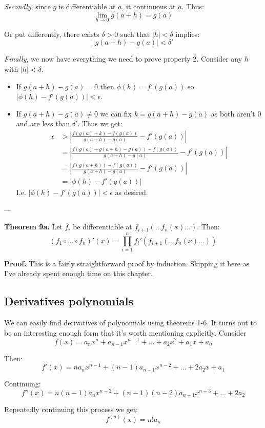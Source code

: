 \textit{Secondly}, since $g$ is differentiable at $a$, it continuous
at $a$. Thus:
\[\lim_{h\to0}g(a+h)=g(a)\]

Or put differently, there exists $\delta>0$ such that $|h|<\delta$ implies:
\[|g(a+h)-g(a)|<\delta'\]

\textit{Finally}, we now have everything we need to prove property 2.
Consider any $h$ with $|h|<\delta$.
\begin{itemize}
\item If $g(a+h)-g(a)=0$ then $\phi(h)=f'(g(a))$ so $|\phi(h)-f'(g(a))|<\epsilon$.
\item If $g(a+h)-g(a)\neq0$ we can fix $k=g(a+h)-g(a)$ as both aren't
  $0$ and are less than $\delta'$. Thus we get:
\begin{align*}
  \epsilon&>\left|\frac{f(g(a)+k)-f(g(a))}{g(a+h)-g(a)}-f'(g(a))\right|\\
  &=\left|\frac{f(g(a)+g(a+h)-g(a))-f(g(a))}{g(a+h)-g(a)}-f'(g(a))\right|\\
  &=\left|\frac{f(g(a+h))-f(g(a))}{g(a+h)-g(a)}-f'(g(a))\right|\\
  &=\left|\phi(h)-f'(g(a))\right|
\end{align*}
I.e. $\left|\phi(h)-f'(g(a))\right|<\epsilon$ as desired.
\end{itemize}

\vs---\vs

\textbf{Theorem 9a.} Let $f_i$ be differentiable at
$f_{i+1}(\dots f_n(x) \dots)$. Then:
\[(f_1\circ \ldots\circ f_n)'(x) = \prod_{i=1}^{n} f_i' \left( f_{i+1}(\dots f_n(x) \dots) \right)\]

\vs

\textbf{Proof.} This is a fairly straightforward proof by induction.
Skipping it here as I've already spent enough time on this chapter.

\subsection{Derivatives polynomials}
We can easily find derivatives of polynomials using theorems 1-6. It
turns out to be an interesting enough form that it's worth mentioning
explicitly. Consider
\[f(x)=a_nx^n+a_{n-1}x^{n-1}+\ldots+a_2x^2+a_1x+a_0\]

Then:
\[f'(x)=na_nx^{n-1}+(n-1)a_{n-1}x^{n-2}+\ldots+2a_2x+a_1\]

Continuing:
\[f''(x)=n(n-1)a_nx^{n-2}+(n-1)(n-2)a_{n-1}x^{n-3}+\ldots+2a_2\]

Repeatedly continuing this process we get:
\[f^{(n)}(x)=n!a_n\]

